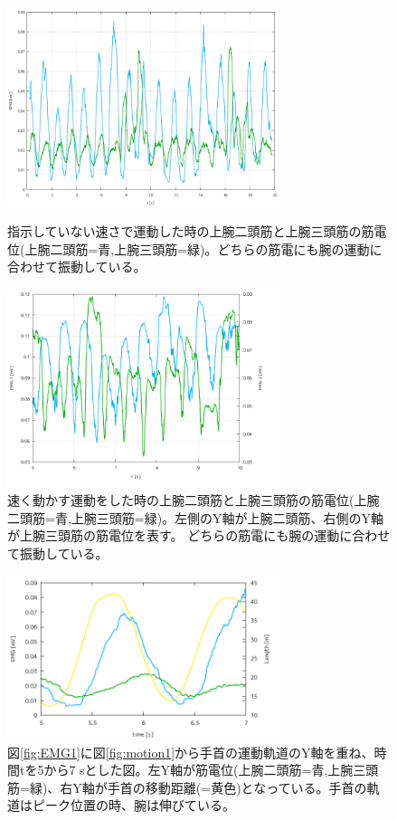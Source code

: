 \documentclass{jsarticle}
\begin{document}
\begin{figure}[htbp]
  \begin{minipage}{0.5\hsize}
    \begin{center}
      \includegraphics[clip,width=80mm]{Graph_4.png}
      \caption{指示していない速さで運動した時の上腕二頭筋と上腕三頭筋の筋電位(上腕二頭筋=青,上腕三頭筋=緑)。どちらの筋電にも腕の運動に合わせて振動している。 \label{fig:EMG1}}
    \end{center}
  \end{minipage}
  \begin{minipage}{0.5\hsize}
    \begin{center}
      \includegraphics[clip,width=80mm]{Graph_5.png}
      \caption{速く動かす運動をした時の上腕二頭筋と上腕三頭筋の筋電位(上腕二頭筋=青,上腕三頭筋=緑)。左側のY軸が上腕二頭筋、右側のY軸が上腕三頭筋の筋電位を表す。 どちらの筋電にも腕の運動に合わせて振動している。\label{fig:EMG2}}
    \end{center}
  \end{minipage}
\end{figure}

\begin{figure}[htbp]
  \begin{center}
    \includegraphics[clip,width=80mm]{Graph_7.png}
    \caption{図\ref{fig:EMG1}に図\ref{fig:motion1}から手首の運動軌道のY軸を重ね、時間tを5から7 sとした図。左Y軸が筋電位(上腕二頭筋=青,上腕三頭筋=緑)、右Y軸が手首の移動距離(=黄色)となっている。手首の軌道はピーク位置の時、腕は伸びている。\label{fig:+length}}
  \end{center}
\end{figure}

  
\end{document}
